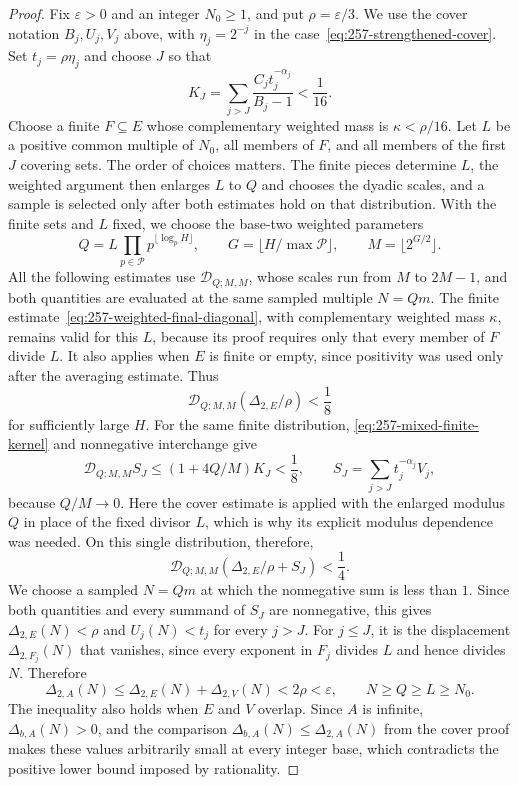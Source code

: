 \begin{proof}
Fix $\varepsilon>0$ and an integer $N_0\ge1$, and put $\rho=\varepsilon/3$.
We use the cover notation $B_j,U_j,V_j$ above, with $\eta_j=2^{-j}$ in
the case~\eqref{eq:257-strengthened-cover}.  Set $t_j=\rho\eta_j$ and choose
$J$ so that
\[
 K_J=\sum_{j>J}\frac{C_jt_j^{-\alpha_j}}{B_j-1}<\frac1{16}.
\]
Choose a finite $F\subseteq E$ whose complementary weighted mass is
$\kappa<\rho/16$.  Let $L$ be a positive common multiple of $N_0$, all
members of $F$, and all members of the first $J$ covering sets. The order
of choices matters. The finite pieces determine $L$, the weighted
argument then enlarges $L$ to $Q$ and chooses the dyadic scales, and a
sample is selected only after both estimates hold on that distribution.
With the finite sets and $L$ fixed, we choose the base-two weighted
parameters
\[
 Q=L\prod_{p\in\mathcal P}p^{\lfloor\log_pH\rfloor},\qquad
 G=\lfloor H/\max\mathcal P\rfloor,\qquad M=\lfloor2^{G/2}\rfloor.
\]
All the following estimates use $\mathscr D_{Q;M,M}$, whose scales run
from $M$ to $2M-1$, and both quantities are evaluated at the same sampled
multiple $N=Qm$.
The finite estimate~\eqref{eq:257-weighted-final-diagonal}, with complementary
weighted mass $\kappa$, remains valid for this $L$, because its proof
requires only that every member of $F$ divide $L$. It also applies when
$E$ is finite or empty, since positivity was used only after the
averaging estimate. Thus
\[
 \mathscr D_{Q;M,M}(\Delta_{2,E}/\rho)<\frac18
\]
for sufficiently large $H$.  For the same finite distribution, \eqref{eq:257-mixed-finite-kernel} and
nonnegative interchange give
\[
 \mathscr D_{Q;M,M}S_J\le(1+4Q/M)K_J<\frac18,
 \qquad S_J=\sum_{j>J}t_j^{-\alpha_j}V_j,
\]
because $Q/M\to0$. Here the cover estimate is applied with the enlarged
modulus $Q$ in place of the fixed divisor $L$, which is why its explicit
modulus dependence was needed. On this single distribution, therefore,
\[
 \mathscr D_{Q;M,M}(\Delta_{2,E}/\rho+S_J)<\frac14.
\]
We choose a sampled $N=Qm$ at which the nonnegative sum is less than $1$.
Since both quantities and every summand of $S_J$ are nonnegative, this
gives
$\Delta_{2,E}(N)<\rho$ and $U_j(N)<t_j$ for every $j>J$.
For $j\le J$, it is the displacement $\Delta_{2,F_j}(N)$ that vanishes,
since every exponent in $F_j$ divides $L$ and hence divides $N$. Therefore
\[
 \Delta_{2,A}(N)\le\Delta_{2,E}(N)+\Delta_{2,V}(N)<2\rho<\varepsilon,
 \qquad N\ge Q\ge L\ge N_0.
\]
The inequality also holds when $E$ and $V$ overlap. Since $A$ is
infinite, $\Delta_{b,A}(N)>0$, and the comparison
$\Delta_{b,A}(N)\le\Delta_{2,A}(N)$ from the cover proof makes these
values arbitrarily small at every integer base, which contradicts the
positive lower bound imposed by rationality.
\end{proof}


